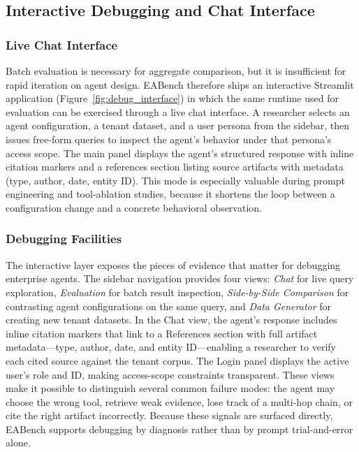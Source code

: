\subsection{Interactive Debugging and Chat Interface}
\label{sec:method_interactive}

\subsubsection{Live Chat Interface}

Batch evaluation is necessary for aggregate comparison, but it is insufficient for rapid iteration on agent design. EABench therefore ships an interactive Streamlit application (Figure~\ref{fig:debug_interface}) in which the same runtime used for evaluation can be exercised through a live chat interface. A researcher selects an agent configuration, a tenant dataset, and a user persona from the sidebar, then issues free-form queries to inspect the agent's behavior under that persona's access scope. The main panel displays the agent's structured response with inline citation markers and a references section listing source artifacts with metadata (type, author, date, entity ID). This mode is especially valuable during prompt engineering and tool-ablation studies, because it shortens the loop between a configuration change and a concrete behavioral observation.

\subsubsection{Debugging Facilities}

The interactive layer exposes the pieces of evidence that matter for debugging enterprise agents. The sidebar navigation provides four views: \emph{Chat} for live query exploration, \emph{Evaluation} for batch result inspection, \emph{Side-by-Side Comparison} for contrasting agent configurations on the same query, and \emph{Data Generator} for creating new tenant datasets. In the Chat view, the agent's response includes inline citation markers that link to a References section with full artifact metadata---type, author, date, and entity ID---enabling a researcher to verify each cited source against the tenant corpus. The Login panel displays the active user's role and ID, making access-scope constraints transparent. These views make it possible to distinguish several common failure modes: the agent may choose the wrong tool, retrieve weak evidence, lose track of a multi-hop chain, or cite the right artifact incorrectly. Because these signals are surfaced directly, EABench supports debugging by diagnosis rather than by prompt trial-and-error alone.


